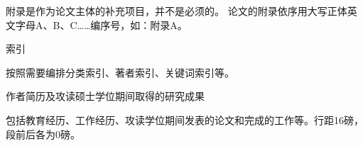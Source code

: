 \documentclass{bjtuthesis}
\begin{document}
\indent{}附录是作为论文主体的补充项目，并不是必须的。
论文的附录依序用大写正体英文字母A、B、C……编序号，如：附录A。
\cleardoublepage
\begin{center}
{\heiti 索引}
\end{center}

\indent{}按照需要编排分类索引、著者索引、关键词索引等。
\cleardoublepage
\begin{thecenter}
作者简历及攻读硕士学位期间取得的研究成果
\end{thecenter}

包括教育经历、工作经历、攻读学位期间发表的论文和完成的工作等。行距16磅，段前后各为0磅。
\cleardoublepage
\cstatement
\clastpage
\end{document}
